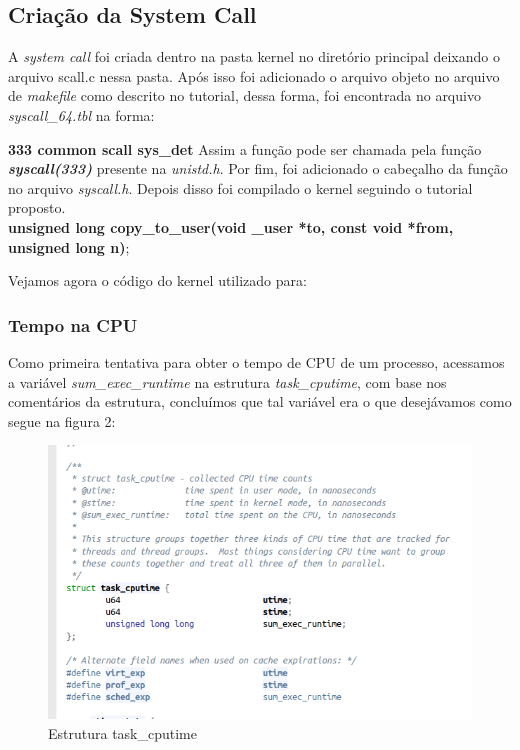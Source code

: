\documentclass[12pt]{article}
\begin{document}
\subsection*{Criação da System Call}
A \textit{system call} foi criada dentro na pasta kernel no diretório principal deixando o arquivo  scall.c nessa pasta. Após isso foi adicionado o arquivo objeto no arquivo de \textit{makefile} como descrito no tutorial, dessa forma, foi encontrada no arquivo \textit{syscall\_64.tbl} na forma: \newline

\textbf{333	common	scall			sys\_det}
\newline
Assim a função pode ser chamada pela função \textit{\textbf{syscall(333)}} presente na \textit{unistd.h}. Por fim, foi adicionado o cabeçalho da função no arquivo \textit{syscall.h}. Depois disso foi compilado o kernel seguindo o tutorial proposto\cite{scall}. 
\\ \newline
\scriptsize{\textbf{unsigned long copy\_to\_user(void \_user *to, const void *from, unsigned long n)};}
\newline
\normalsize
	
Vejamos agora o código do kernel utilizado para:

\subsubsection*{Tempo na CPU}
	Como primeira tentativa para obter o tempo de CPU de um processo, acessamos a variável \textit{sum\_exec\_runtime} na estrutura \textit{task\_cputime}, com base nos comentários da estrutura, concluímos que tal variável era o que desejávamos como segue na figura 2: %

\begin{figure}[!htb]
	\centering
	\includegraphics[scale=0.5]{imagens/img1.png}
	\caption{Estrutura task\_cputime}
	\label{taskcputime}
\end{figure}
\end{document}
